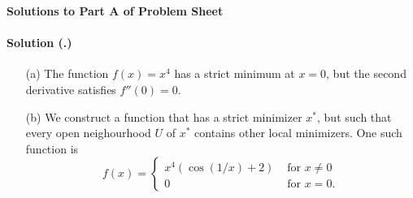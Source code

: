 \documentclass{article}
\newcounter{problemSheetNumber}
\newcounter{problems}
\renewcommand{\solution}[1]{\paragraph{Solution (\theproblemSheetNumber.\theproblems)}\addtocounter{problems}{1}\label{#1}}
\begin{document}
 
\begin{center}
{\Large {\bf Solutions to Part A of Problem Sheet \theproblemSheetNumber}}
\end{center}

\solution{pr:1}
\begin{itemize}
 \item[(a)] The function $f(x)=x^4$ has a strict minimum at $x=0$, but the second derivative satisfies $f''(0)=0$. 
 \item[(b)] We construct a function that has a strict minimizer $x^*$, but such that every open neighourhood $U$ of $x^*$ contains other local minimizers. One such function is
 \begin{equation*}
  f(x) = \begin{cases} x^4 (\cos(1/x)+2) & \text{ for } x\neq 0\\
          0 & \text{ for } x=0.
         \end{cases}
 \end{equation*}


\end{itemize}
\end{document}

